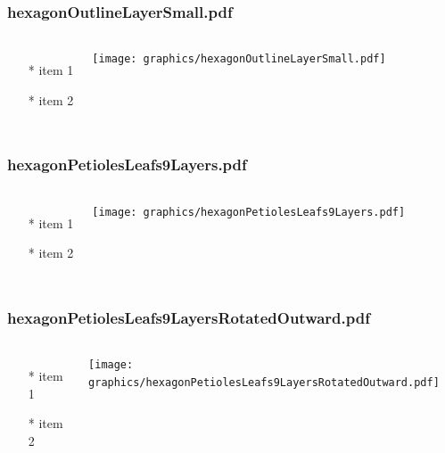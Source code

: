 \begin{frame} \frametitle{hexagonOutlineLayerSmall.pdf}
    \begin{columns}[c]
        \begin{itemize}
            \item[*] item 1
            \item[*] item 2
        \end{itemize}
        \begin{minipage}{\linewidth}
            \begin{center}
            \texttt{[image: graphics/hexagonOutlineLayerSmall.pdf]}
            \label{gfx:hexagonOutlineLayerSmall.pdf}
            \end{center}
        \end{minipage}
    \end{columns}
\end{frame}
\begin{frame} \frametitle{hexagonPetiolesLeafs9Layers.pdf}
    \begin{columns}[c]
        \begin{itemize}
            \item[*] item 1
            \item[*] item 2
        \end{itemize}
        \begin{minipage}{\linewidth}
            \begin{center}
            \texttt{[image: graphics/hexagonPetiolesLeafs9Layers.pdf]}
            \label{gfx:hexagonPetiolesLeafs9Layers.pdf}
            \end{center}
        \end{minipage}
    \end{columns}
\end{frame}
\begin{frame} \frametitle{hexagonPetiolesLeafs9LayersRotatedOutward.pdf}
    \begin{columns}[c]
        \begin{itemize}
            \item[*] item 1
            \item[*] item 2
        \end{itemize}
        \begin{minipage}{\linewidth}
            \begin{center}
            \texttt{[image: graphics/hexagonPetiolesLeafs9LayersRotatedOutward.pdf]}
            \label{gfx:hexagonPetiolesLeafs9LayersRotatedOutward.pdf}
            \end{center}
        \end{minipage}
    \end{columns}
\end{frame}
